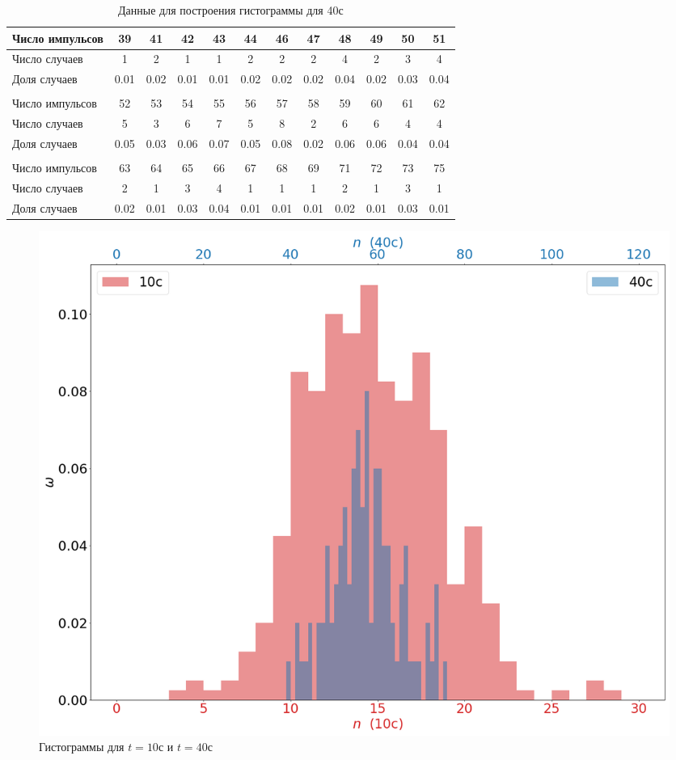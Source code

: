 \documentclass[a4paper, 12pt]{article}
\begin{document}
    \begin{table}[H]
    \begin{center}
    \begin{tabular}{|l|c|c|c|c|c|c|c|c|c|c|c|}\hline
    Число импульсов & 39 & 41 & 42 & 43 & 44 & 46 & 47 & 48 & 49 & 50 & 51 \\\hline
    Число случаев & 1 & 2 & 1 & 1 & 2 & 2 & 2 & 4 & 2 & 3 & 4 \\\hline
    Доля случаев & 0.01 & 0.02 & 0.01 & 0.01 & 0.02 & 0.02 & 0.02 & 0.04 & 0.02 & 0.03 & 0.04 \\\hline
    \multicolumn{9}{c}{}\\\hline
    Число импульсов & 52 & 53 & 54 & 55 & 56 & 57 & 58 & 59 & 60 & 61 & 62 \\\hline
    Число случаев & 5 & 3 & 6 & 7 & 5 & 8 & 2 & 6 & 6 & 4 & 4 \\\hline
    Доля случаев & 0.05 & 0.03 & 0.06 & 0.07 & 0.05 & 0.08 & 0.02 & 0.06 & 0.06 & 0.04 & 0.04 \\\hline
    \multicolumn{9}{c}{}\\\hline
    Число импульсов & 63 & 64 & 65 & 66 & 67 & 68 & 69 & 71 & 72 & 73 & 75 \\\hline
    Число случаев & 2 & 1 & 3 & 4 & 1 & 1 & 1 & 2 & 1 & 3 & 1 \\\hline
    Доля случаев & 0.02 & 0.01 & 0.03 & 0.04 & 0.01 & 0.01 & 0.01 & 0.02 & 0.01 & 0.03 & 0.01 \\\hline
    \end{tabular}
    \caption{Данные для построения гистограммы для 40с}
    \end{center}
    \end{table}
    \newpage

    \begin{figure}
        \includegraphics[scale=0.45]{histogram.png}
        \caption{Гистограммы для $t=10с$ и $t=40с$}
    \end{figure}
\end{document}
